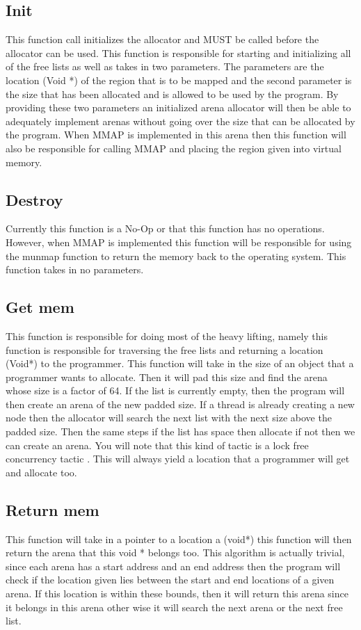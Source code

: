 \documentclass[conference]{IEEEtran}
\begin{document}
\subsection{Init}
This function call initializes the allocator and MUST be called before the allocator can be used. This function is responsible for starting and initializing all of the free lists as well as takes in two parameters. The parameters are the location (Void *) of the region that is to be mapped and the second parameter is the size that has been allocated and is allowed to be used by the program. By providing these two parameters an initialized arena allocator will then be able to adequately implement arenas without going over the size that can be allocated by the program. When MMAP is implemented in this arena then this function will also be responsible for calling MMAP and placing the region given into virtual memory. 
\subsection{Destroy}
Currently this function is a No-Op or that this function has no operations. However, when MMAP is implemented this function will be responsible for using the munmap function to return the memory back to the operating system. This function takes in no parameters. 
\subsection{Get mem}
This function is responsible for doing most of the heavy lifting, namely this function is responsible for traversing the free lists and returning a location (Void*) to the programmer. This function will take in the size of an object that a programmer wants to allocate. Then it will pad this size and find the arena whose size is a factor of 64. If the list is currently empty, then the program will then create an arena of the new padded size. If a thread is already creating a new node then the allocator will search the next list with the next size above the padded size. Then the same steps if the list has space then allocate if not then we can create an arena. You will note that this kind of tactic is a lock free concurrency tactic \cite{ScalableLock}. This will always yield a location that a programmer will get and allocate too. 
\subsection{Return mem}
This function will take in a pointer to a location a (void*) this function will then return the arena that this void * belongs too. This algorithm is actually trivial, since each arena has a start address and an end address then the program will check if the location given lies between the start and end locations of a given arena. If this location is within these bounds, then it will return this arena since it belongs in this arena other wise it will search the next arena or the next free list.
\end{document}
